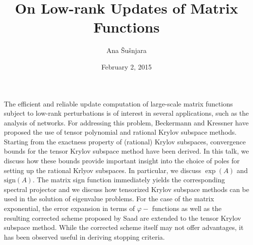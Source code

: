 \documentclass{article}
\title{On Low-rank Updates of Matrix Functions}
\author{Ana \v{S}u\v{s}njara}
\affil{PhD student at EPF Lausanne}
\date{February 2, 2015}
\begin{document}
\maketitle

\setcounter{page}{12}
The efficient and reliable update computation of large-scale matrix functions subject to low-rank perturbations is of interest in several applications, such as the analysis of networks. For addressing this problem, Beckermann and Kressner have proposed the use of tensor polynomial and rational Krylov subspace methods. Starting from the exactness property of (rational) Krylov subspaces, convergence bounds for the tensor Krylov subspace method have been derived. In this talk, we discuss how these bounds provide important insight into the choice of poles for setting up the rational Krlyov subspaces. In particular, we discuss $\exp(A)$ and $\textrm{sign}(A)$. The matrix sign function immediately yields the corresponding spectral projector and we discuss how tensorized Krylov subspace methods can be used in the solution of eigenvalue problems. For the case of the matrix exponential, the error expansion in terms of $\varphi-$ functions as well as the resulting corrected scheme proposed by Saad are extended to the tensor Krylov subspace method. While the corrected scheme itself may not offer advantages, it has been observed useful in deriving stopping criteria.  
\end{document}
